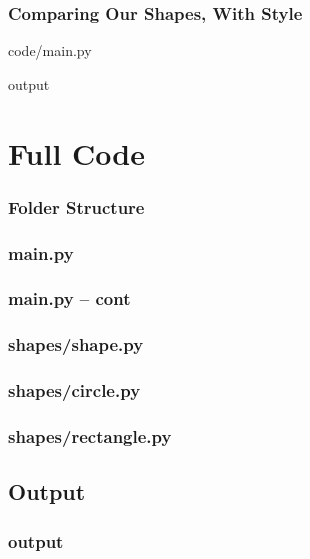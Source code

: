 \documentclass{beamer}
\newcommand{\closenewline}{%
  \par\nopagebreak
  \vspace{-\itemsep}
  \vspace{-\parsep}
}
\begin{document}
  \begin{frame}
    \frametitle{Comparing Our Shapes, With Style}

    code/main.py
    
    \closenewline
    
    \closenewline
    
    \closenewline
    

    output
    
    \closenewline
    
    \closenewline
    
  \end{frame}

\appendix
\section{Full Code}
  \begin{frame}
    \frametitle{Folder Structure}
  \end{frame}

  \begin{frame}
    \frametitle{main.py}
    
  \end{frame}

  \begin{frame}
    \frametitle{main.py -- cont}
    
  \end{frame}

  \begin{frame}
    \frametitle{shapes/shape.py}
    
  \end{frame}

  \begin{frame}
    \frametitle{shapes/circle.py}
    
  \end{frame}

  \begin{frame}
    \frametitle{shapes/rectangle.py}
    
  \end{frame}

\subsection{Output}
  \begin{frame}
    \frametitle{output}
    
  \end{frame}
\end{document}
